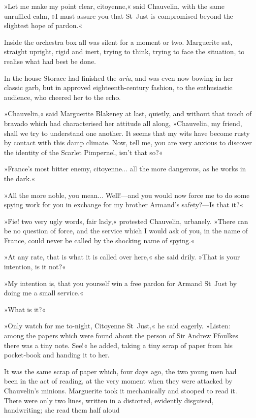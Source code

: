 »Let me make my point clear, citoyenne,« said Chauvelin, with the same unruffled calm, »I must assure you that St~Just is compromised beyond the slightest hope of pardon.«

Inside the orchestra box all was silent for a moment or two. Marguerite sat, straight upright, rigid and inert, trying to think, trying to face the situation, to realise what had best be done.

In the house Storace had finished the \textit{aria}, and was even now bowing in her classic garb, but in approved eighteenth-century fashion, to the enthusiastic audience, who cheered her to the echo.

»Chauvelin,« said Marguerite Blakeney at last, quietly, and without that touch of bravado which had characterised her attitude all along, »Chauvelin, my friend, shall we try to understand one another. It seems that my wits have become rusty by contact with this damp climate. Now, tell me, you are very anxious to discover the identity of the Scarlet Pimpernel, isn't that so?«

»France's most bitter enemy, citoyenne... all the more dangerous, as he works in the dark.«

»All the more noble, you mean... Well!\allowbreak---\allowbreak and you would now force me to do some spying work for you in exchange for my brother Armand's safety?\allowbreak---\allowbreak Is that it?«

»Fie! two very ugly words, fair lady,« protested Chauvelin, urbanely. »There can be no question of force, and the service which I would ask of you, in the name of France, could never be called by the shocking name of spying.«

»At any rate, that is what it is called over here,« she said drily. »That is your intention, is it not?«

»My intention is, that you yourself win a free pardon for Armand St~Just by doing me a small service.«

»What is it?«

»Only watch for me to-night, Citoyenne St~Just,« he said eagerly. »Listen: among the papers which were found about the person of Sir Andrew Ffoulkes there was a tiny note. See!« he added, taking a tiny scrap of paper from his pocket-book and handing it to her.

It was the same scrap of paper which, four days ago, the two young men had been in the act of reading, at the very moment when they were attacked by Chauvelin's minions. Marguerite took it mechanically and stooped to read it. There were only two lines, written in a distorted, evidently disguised, handwriting; she read them half aloud\longdash


